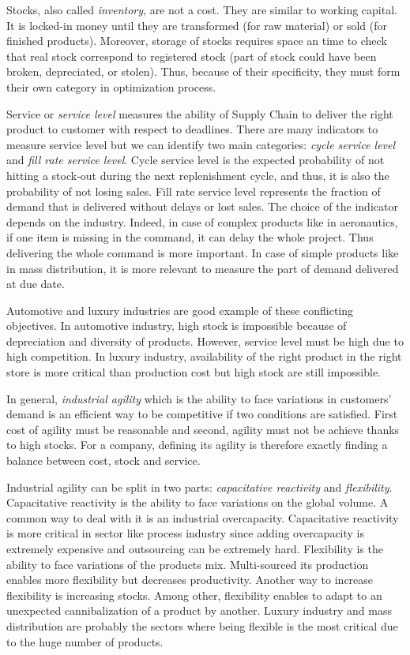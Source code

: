 Stocks, also called \emph{inventory}, are not a cost.
They are similar to working capital.
It is locked-in money until they are transformed (for raw material) or sold (for finished products).
Moreover, storage of stocks requires space an time to check that real stock correspond to registered stock (part of stock could have been broken, depreciated, or stolen).
Thus, because of their specificity, they must form their own category in optimization process.


Service or \emph{service level} measures the ability of Supply Chain to deliver the right product to customer with respect to deadlines.
There are many indicators to measure service level but we can identify two main categories: \emph{cycle service level} and \emph{fill rate service level}.
Cycle service level is the expected probability of not hitting a stock-out during the next replenishment cycle, and thus, it is also the probability of not losing sales.
Fill rate service level represents the fraction of demand that is delivered without delays or lost sales.
The choice of the indicator depends on the industry.
Indeed, in case of complex products like in aeronautics, if one item is missing in the command, it can delay the whole project.
Thus delivering the whole command is more important.
In case of simple products like in mass distribution, it is more relevant to measure the part of demand delivered at due date.


\medskip


Automotive and luxury industries are good example of these conflicting objectives.
In automotive industry, high stock is impossible because of depreciation and diversity of products.
However, service level must be high due to high competition.
In luxury industry, availability of the right product in the right store is more critical than production cost but high stock are still impossible.


In general, \emph{industrial agility} which is the ability to face variations in customers' demand is an efficient way to be competitive if two conditions are satisfied.
First cost of agility must be reasonable and second, agility must not be achieve thanks to high stocks.
For a company, defining its agility is therefore exactly finding a balance between cost, stock and service.


Industrial agility can be split in two parts: \emph{capacitative reactivity} and \emph{flexibility}.
Capacitative reactivity is the ability to face variations on the global volume.
A common way to deal with it is an industrial overcapacity.
Capacitative reactivity is more critical in sector like process industry since adding overcapacity is extremely expensive and outsourcing can be extremely hard.
Flexibility is the ability to face variations of the products mix.
Multi-sourced its production enables more flexibility but decreases productivity.
Another way to increase flexibility is increasing stocks.
Among other, flexibility enables to adapt to an unexpected cannibalization of a product by another.
Luxury industry and mass distribution are probably the sectors where being flexible is the most critical due to the huge number of products.


